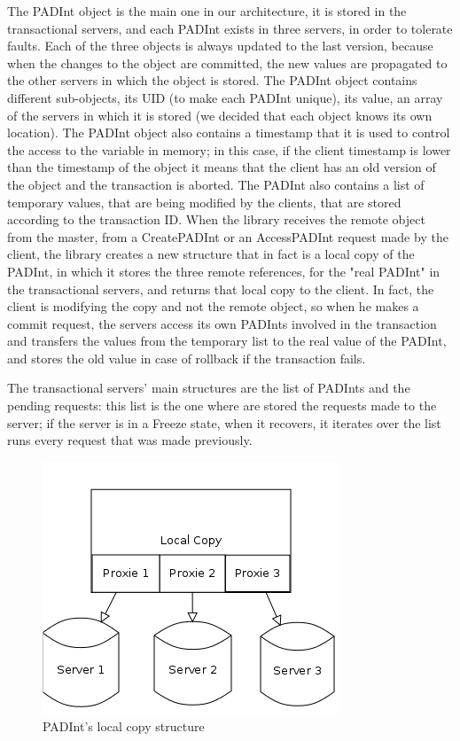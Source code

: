 \documentclass[times, 10pt,twocolumn]{article}
\begin{document}
The PADInt object is the main one in our architecture, it is stored in the transactional servers, and each PADInt exists in three servers, in order to tolerate faults. Each of the three objects is always updated to the last version, because when the changes to the object are committed, the new values are propagated to the other servers in which the object is stored. The PADInt object contains different sub-objects, its UID (to make each PADInt unique), its value, an array of the servers in which it is stored (we decided that each object knows its own location). The PADInt object also contains a timestamp that it is used to control the access to the variable in memory; in this case, if the client timestamp is lower than the timestamp of the object it means that the client has an old version of the object and the transaction is aborted. The PADInt also contains a list of temporary values, that are being modified by the clients, that are stored according to the transaction ID. When the library receives the remote object from the master, from a CreatePADInt or an AccessPADInt request made by the client, the library creates a new structure that in fact is a local copy of the PADInt, in which it stores the three remote references, for the "real PADInt" in the transactional servers, and returns that local copy to the client. In fact, the client is modifying the copy and not the remote object, so when he makes a commit request, the servers access its own PADInts involved in the transaction and transfers the values from the temporary list to the real value of the PADInt, and stores the old value in case of rollback if the transaction fails.

The transactional servers' main structures are the list of PADInts and the pending requests: this list is the one where are stored the requests made to the server; if the server is in a Freeze state, when it recovers, it iterates over the list runs every request that was made previously.

\begin{figure}[h!]

\centering

\includegraphics[scale=0.4]{Padint.png}

\caption{PADInt's local copy structure}

\end{figure}
\end{document}
